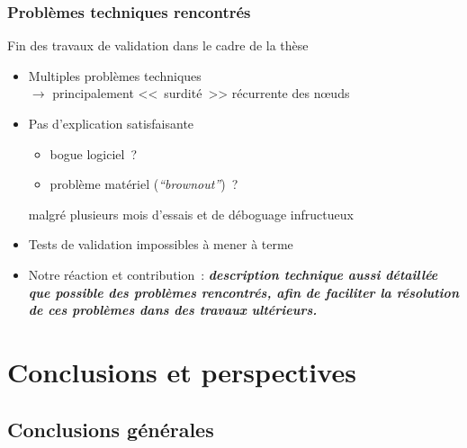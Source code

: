 \documentclass[10pt,c]{beamer}
\newcommand{\lang}[1]{\textit{#1}}
\renewcommand{\emph}[1]{\textbf{\textit{#1}}}
\begin{document}
\begin{frame}[label=Problemes1]
\frametitle{Problèmes techniques rencontrés}

\begin{block}{Fin des travaux de validation dans le cadre de la thèse}
\begin{itemize}
\item Multiples problèmes techniques \\
      $\rightarrow$ principalement <<~surdité~>> récurrente des n{\oe}uds
\item Pas d'explication satisfaisante
  \begin{itemize}
  \item bogue logiciel~?
  \item problème matériel (\lang{``brownout''})~?
  \end{itemize}
 malgré plusieurs mois d'essais et de déboguage infructueux
\item Tests de validation impossibles à mener à terme
\item Notre réaction et contribution~: \emph{description technique aussi
détaillée que possible des problèmes rencontrés, afin de faciliter
la résolution de ces problèmes dans des travaux ultérieurs.}
\end{itemize}

\end{block}

\end{frame}


\section{Conclusions et perspectives}


\subsection{Conclusions générales}
\end{document}
